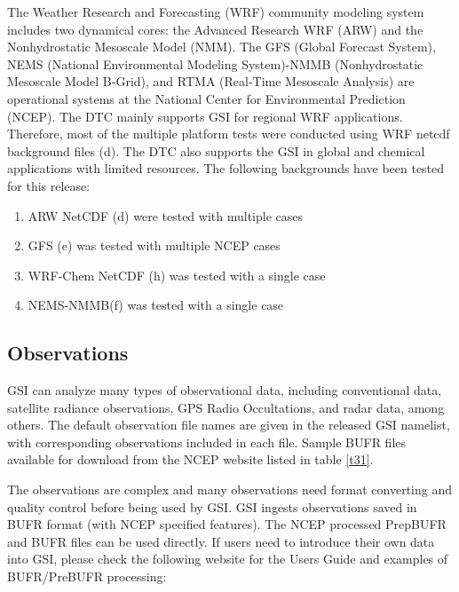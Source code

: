 The Weather Research and Forecasting (WRF) community modeling system includes two dynamical cores: the Advanced Research WRF (ARW) and the Nonhydrostatic Mesoscale Model (NMM). The GFS (Global Forecast System), NEMS (National Environmental Modeling System)-NMMB (Nonhydrostatic Mesoscale Model B-Grid), and RTMA (Real-Time Mesoscale Analysis) are operational systems at the National Center for Environmental Prediction (NCEP). The DTC mainly supports GSI for regional WRF applications. Therefore, most of the multiple platform tests were conducted using WRF netcdf background files (d). The DTC also supports the GSI in global and chemical applications with limited resources. The following backgrounds have been tested for this release:

\begin{small}
\begin{enumerate}
\item ARW NetCDF (d) were tested with multiple cases
\item GFS (e) was tested with multiple NCEP cases
\item WRF-Chem NetCDF (h) was tested with a single case
\item NEMS-NMMB(f) was tested with a single case
\end{enumerate}
\end{small}


\subsection{Observations}

GSI can analyze many types of observational data, including conventional data, satellite radiance observations, GPS Radio Occultations, and radar data, among others. The default observation file names are given in the released GSI namelist, with corresponding observations included in each file. Sample BUFR files available for download from the NCEP website listed in table \ref{t31}. 

The observations are complex and many observations need format converting and quality control before being used by GSI. GSI ingests observations saved in BUFR format (with NCEP specified features). The NCEP processed PrepBUFR and BUFR files can be used directly. If users need to introduce their own data into GSI, please check the following website for the User\textquotesingle s Guide and examples of BUFR/PreBUFR processing: 


